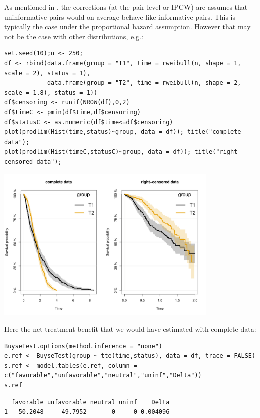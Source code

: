 \documentclass[12pt]{article}
\begin{document}
As mentioned in \cite{peron2021correcting}, the corrections (at the pair
level or IPCW) are assumes that uninformative pairs would on average
behave like informative pairs. This is typically the case under the
proportional hazard assumption. However that may not be the case with
other distributions, e.g.:
\lstset{language=r,label= ,caption= ,captionpos=b,numbers=none}
\begin{lstlisting}
set.seed(10);n <- 250; 
df <- rbind(data.frame(group = "T1", time = rweibull(n, shape = 1, scale = 2), status = 1),
            data.frame(group = "T2", time = rweibull(n, shape = 2, scale = 1.8), status = 1))
df$censoring <- runif(NROW(df),0,2)
df$timeC <- pmin(df$time,df$censoring)
df$statusC <- as.numeric(df$time<=df$censoring)
plot(prodlim(Hist(time,status)~group, data = df)); title("complete data");
plot(prodlim(Hist(timeC,statusC)~group, data = df)); title("right-censored data");
\end{lstlisting}
\begin{center}
\includegraphics[width=0.8\textwidth]{./figures/plot-crossingSurv.pdf}
\end{center}

Here the net treatment benefit that we would have estimated with complete data:
\lstset{language=r,label= ,caption= ,captionpos=b,numbers=none}
\begin{lstlisting}
BuyseTest.options(method.inference = "none")
e.ref <- BuyseTest(group ~ tte(time,status), data = df, trace = FALSE)
s.ref <- model.tables(e.ref, column = c("favorable","unfavorable","neutral","uninf","Delta"))
s.ref
\end{lstlisting}

\begin{verbatim}
  favorable unfavorable neutral uninf    Delta
1   50.2048     49.7952       0     0 0.004096
\end{verbatim}
\end{document}
